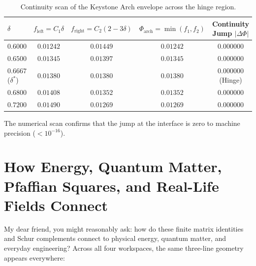 \documentclass[11pt,a4paper]{article}
\theoremstyle{definition}
\begin{document}
\begin{table}[h]
\centering
\small
\begin{tabular}{lcccc}
\toprule
$\delta$ & $f_{\mathrm{left}} = C_1 \delta$ & $f_{\mathrm{right}} = C_2(2 - 3\delta)$ & $\Phi_{\mathrm{arch}} = \min(f_1, f_2)$ & Continuity Jump $|\Delta \Phi|$ \\
\midrule
$0.6000$ & $0.01242$ & $0.01449$ & $0.01242$ & $0.000000$ \\
$0.6500$ & $0.01345$ & $0.01397$ & $0.01345$ & $0.000000$ \\
$0.6667$ ($\delta^*$) & $0.01380$ & $0.01380$ & $0.01380$ & $0.000000$ (Hinge) \\
$0.6800$ & $0.01408$ & $0.01352$ & $0.01352$ & $0.000000$ \\
$0.7200$ & $0.01490$ & $0.01269$ & $0.01269$ & $0.000000$ \\
\bottomrule
\end{tabular}
\caption{Continuity scan of the Keystone Arch envelope across the hinge region.}
\label{tab:hinge_scan}
\end{table}

The numerical scan confirms that the jump at the interface is zero to machine precision ($< 10^{-16}$).


\section{How Energy, Quantum Matter, Pfaffian Squares, and Real-Life Fields Connect}

My dear friend, you might reasonably ask: how do these finite matrix identities and Schur complements connect to physical energy, quantum matter, and everyday engineering? Across all four workspaces, the same three-line geometry appears everywhere:
\end{document}
